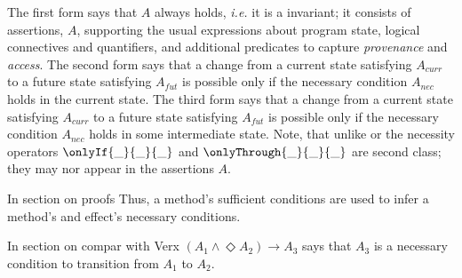 

The first form says that $A$ always holds, \textit{i.e.} it is a invariant; 
it consists of assertions,  $A$, supporting the usual expressions about program state,
  logical connectives and quantifiers, 
 and additional predicates
 to capture \textit{provenance} and \textit{access}.
The second form says that  a change from a current state satisfying $A_{curr}$ to a future
state satisfying $A_{fut}$ %
is possible only if the necessary condition
$A_{nec}$ holds in the current state.
%
The third form says that a change from a current state satisfying $A_{curr}$ to a future
state satisfying $A_{fut}$  is possible only if the necessary condition
$A_{nec}$ holds in some intermediate state.
 Note, that unlike \citeauthor{VerX} or \citeauthor{FASE}
 the necessity operators $\onlyIf {\_} {\_} {\_}$  and $\onlyThrough {\_} {\_} {\_}$
 are second class; they may nor appear in the assertions $A$.
 
 In section on proofs
  Thus, 
   a method's sufficient conditions are used to infer a method's and effect's necessary conditions.
 
 In section on compar with Verx
 $(A_1 \wedge \Diamond A_2) \longrightarrow A_3$ says that  $A_3$ is a necessary condition to
 transition from $A_1$ to $A_2$.